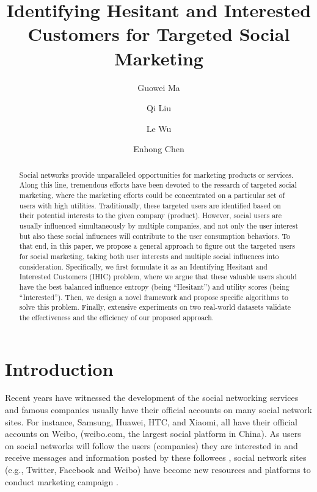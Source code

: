 \documentclass{llncs}
\begin{document}
\setlength{\intextsep}{2pt}
\setlength{\textfloatsep}{2pt}

\title{Identifying Hesitant and Interested Customers for Targeted Social Marketing}

\author{Guowei Ma \and Qi Liu \and Le Wu  \and Enhong Chen }

\maketitle
\begin{abstract}
Social networks provide unparalleled opportunities for marketing products or services. Along this line, tremendous efforts have been devoted to the research of targeted social marketing, where the marketing efforts could be concentrated on a particular set of users with high utilities.
Traditionally, these targeted users are identified based on their potential interests to the given company (product). However, social users are usually influenced simultaneously by multiple companies, and not only the user interest but also these social influences will contribute to the user consumption behaviors. To that end, in this paper, we propose a general approach to figure out the targeted users for social marketing, taking both user interests and multiple social influences into consideration. Specifically, we first formulate it as an Identifying Hesitant and Interested Customers (IHIC) problem, where we argue that these valuable users should have the best balanced influence entropy (being ``Hesitant'') and utility scores (being ``Interested''). Then, we design a novel framework and propose specific algorithms to solve this problem. Finally, extensive experiments on two real-world datasets validate the effectiveness and the efficiency of our proposed approach.
\end{abstract}


\vspace*{-0.3cm}
\section{Introduction} \label{sec:intro}
\vspace*{-0.3cm}

Recent years have witnessed the development of the social networking services and famous companies usually have their official accounts on many social network sites. For instance, Samsung, Huawei, HTC, and Xiaomi, all have their official accounts on Weibo, (weibo.com, the largest social platform in China). As users on social networks will follow the users (companies) they are interested in and receive messages and information posted by these followees \cite{kwak2010twitter}, social network sites (e.g., Twitter, Facebook and Weibo) have become new resources and platforms to conduct marketing campaign \cite{hartline2008optimal}. 
\end{document}
